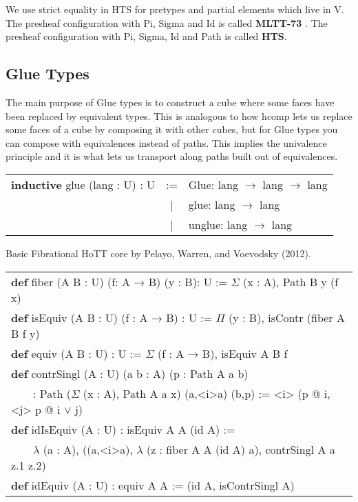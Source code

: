 \documentclass[a4paper,UKenglish,cleveref, autoref, thm-restate]{lipics-v2021}
\newcommand{\tabstyle}[0]{\scriptsize\ttfamily\fontseries{l}\selectfont}
\begin{document}
We use strict equality in HTS for pretypes and partial elements which live in V.
The presheaf configuration with Pi, Sigma and Id is called \textbf{MLTT-73} \cite{MLTT73}. The presheaf
configuration with Pi, Sigma, Id and Path is called \textbf{HTS}.

\newpage
\subsection{Glue Types}

The main purpose of Glue types is to construct a cube where some faces have
been replaced by equivalent types. This is analogous to how hcomp lets us
replace some faces of a cube by composing it with other cubes, but for Glue
types you can compose with equivalences instead of paths. This implies the
univalence principle and it is what lets us transport along paths built
out of equivalences.

\begin{table}[ht]
\tabstyle
\begin{tabular}{rcl}
  \textbf{inductive} glue (lang : U) : U & := & Glue: lang $\rightarrow$ lang $\rightarrow$ lang \\
  &|& glue: lang $\rightarrow$ lang \\
  &|& unglue: lang $\rightarrow$ lang \\
\end{tabular}
\end{table}

Basic Fibrational HoTT core by Pelayo, Warren, and Voevodsky (2012).

\begin{table}[ht]
\tabstyle
\begin{tabular}{l}
\textbf{def} fiber (A B : U) (f: A → B) (y : B): U := $\Sigma$ (x : A), Path B y (f x) \\
\textbf{def} isEquiv (A B : U) (f : A → B) : U := $\Pi$ (y : B), isContr (fiber A B f y) \\
\textbf{def} equiv (A B : U) : U := $\Sigma$ (f : A → B), isEquiv A B f \\
\textbf{def} contrSingl (A : U) (a b : A) (p : Path A a b) \\
\ \ \ \ : Path ($\Sigma$ (x : A), Path A a x) (a,<i>a) (b,p) := <i> (p @ i, <j> p @ i $\vee$ j) \\
\textbf{def} idIsEquiv (A : U) : isEquiv A A (id A) := \\
\ \ \ \ $\lambda$ (a : A), ((a,<i>a), $\lambda$ (z : fiber A A (id A) a), contrSingl A a z.1 z.2) \\
\textbf{def} idEquiv (A : U) : equiv A A := (id A, isContrSingl A) \\
\end{tabular}
\end{table}
\end{document}
